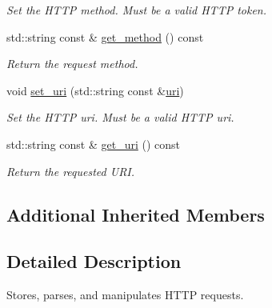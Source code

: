 \begin{DoxyCompactItemize}
\begin{DoxyCompactList}\small\item\em Set the H\+T\+TP method. Must be a valid H\+T\+TP token. \end{DoxyCompactList}\item 
std\+::string const  \& \hyperlink{classwebsocketpp_1_1http_1_1parser_1_1request_a756f90f92127c7a16b0fa52322bbdfda}{get\+\_\+method} () const\hypertarget{classwebsocketpp_1_1http_1_1parser_1_1request_a756f90f92127c7a16b0fa52322bbdfda}{}\label{classwebsocketpp_1_1http_1_1parser_1_1request_a756f90f92127c7a16b0fa52322bbdfda}

\begin{DoxyCompactList}\small\item\em Return the request method. \end{DoxyCompactList}\item 
void \hyperlink{classwebsocketpp_1_1http_1_1parser_1_1request_ac4dcfa00f2112ee33b571f1754f9d893}{set\+\_\+uri} (std\+::string const \&\hyperlink{classwebsocketpp_1_1uri}{uri})\hypertarget{classwebsocketpp_1_1http_1_1parser_1_1request_ac4dcfa00f2112ee33b571f1754f9d893}{}\label{classwebsocketpp_1_1http_1_1parser_1_1request_ac4dcfa00f2112ee33b571f1754f9d893}

\begin{DoxyCompactList}\small\item\em Set the H\+T\+TP uri. Must be a valid H\+T\+TP uri. \end{DoxyCompactList}\item 
std\+::string const  \& \hyperlink{classwebsocketpp_1_1http_1_1parser_1_1request_aac99dca40df93826deca4c8be789847e}{get\+\_\+uri} () const\hypertarget{classwebsocketpp_1_1http_1_1parser_1_1request_aac99dca40df93826deca4c8be789847e}{}\label{classwebsocketpp_1_1http_1_1parser_1_1request_aac99dca40df93826deca4c8be789847e}

\begin{DoxyCompactList}\small\item\em Return the requested U\+RI. \end{DoxyCompactList}\end{DoxyCompactItemize}
\subsection*{Additional Inherited Members}


\subsection{Detailed Description}
Stores, parses, and manipulates H\+T\+TP requests. 

